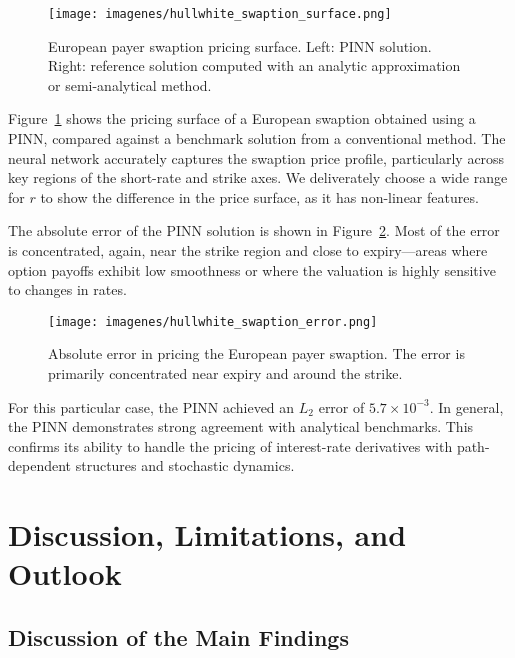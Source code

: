 \documentclass[12pt]{report} %
\theoremstyle{plain}           %
\theoremstyle{definition}      %
\theoremstyle{remark}          %
\begin{document}
\begin{figure}[H]
	\centering
	\texttt{[image: imagenes/hullwhite\_swaption\_surface.png]}
	\caption{European payer swaption pricing surface. Left: PINN solution. Right: reference solution computed with an analytic approximation or semi-analytical method.}
	\label{fig:swaption_surface}
\end{figure}

Figure~\ref{fig:swaption_surface} shows the pricing surface of a European swaption obtained 
using a PINN, compared against a benchmark solution from a conventional method. The neural 
network accurately captures the swaption price profile, particularly across key regions of 
the short-rate and strike axes. We deliverately choose a wide range for $r$ to show 
the difference in the price surface, as it has non-linear features.

The absolute error of the PINN solution is shown in Figure~\ref{fig:swaption_error}. Most of 
the error is concentrated, again, near the strike region and close to expiry—areas where option payoffs 
exhibit low smoothness or where the valuation is highly sensitive to changes in rates.

\begin{figure}[H]
	\centering
	\texttt{[image: imagenes/hullwhite\_swaption\_error.png]}
	\caption{Absolute error in pricing the European payer swaption. The error is primarily concentrated near expiry and around the strike.}
	\label{fig:swaption_error}
\end{figure}

For this particular case, the PINN achieved an \(L_2\) error of \(5.7\times10^{-3}\). In general, 
the PINN demonstrates strong agreement with analytical benchmarks. This confirms its ability to handle the 
pricing of interest-rate derivatives with path-dependent structures and stochastic dynamics.

\chapter{Discussion, Limitations, and Outlook}
\label{ch:discussion}

\section{Discussion of the Main Findings}
\end{document}

